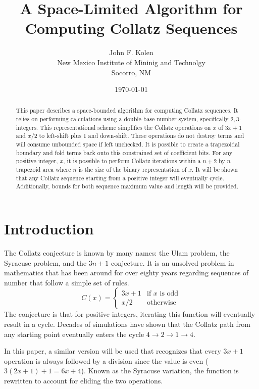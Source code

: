 \documentclass{article}
\title{A Space-Limited Algorithm for Computing Collatz Sequences}
\author{John F. Kolen\\
  New Mexico Institute of Mininig and Technolgy \\
  Socorro, NM
  }
\date{\today}
\begin{document}
\maketitle


\begin{abstract}
  This paper describes a space-bounded algorithm for computing Collatz
  sequences.  It relies on performing calculations using a double-base number
  system, specifically ${2,3}$-integers. This
  representational scheme simplifies the Collatz operations on $x$ of $3x+1$
  and $x/2$ to left-shift plus 1 and down-shift. These operations do not
  destroy terms and will consume unbounded space if left unchecked. It is
  possible to create a trapezoidal boundary and fold terms back onto this constrained
  set of coefficient bits. For any positive integer, $x$, it is possible to perform Collatz
  iterations within a $n+2$ by $n$ trapezoid area where $n$ is the size of the binary
  representation of $x$. It will be shown that any Collatz sequence starting from a positive
  integer will eventually cycle. Additionally, bounds for both sequence maximum value and length will
  be provided.
\end{abstract}

\section{Introduction}

The Collatz conjecture is known by many names: the Ulam problem, the Syracuse
problem, and the $3n+1$ conjecture\cite{lagarias2023ultimate}. It is an unsolved problem in mathematics
that has been around for over eighty years regarding sequences of number that
follow a simple set of rules.
\begin{equation}
  C(x) = \begin{cases}
    3 x + 1 & \text{if } x \text{ is odd}\\
    x / 2 & \text{otherwise}
    \end{cases}
\end{equation}
The conjecture is that for positive integers, iterating this function will eventually
result in a cycle. Decades of simulations have shown that the Collatz path from any
starting point eventually enters the cycle $4\rightarrow2\rightarrow1\rightarrow4$.

In this paper, a similar version will be used that recognizes that every $3x+1$
operation is always followed by a division since the value is even ($3(2x+1) + 1=6x + 4$).
Known as the Syracuse variation, the function is rewritten to account for eliding the
two operations.
\end{document}
